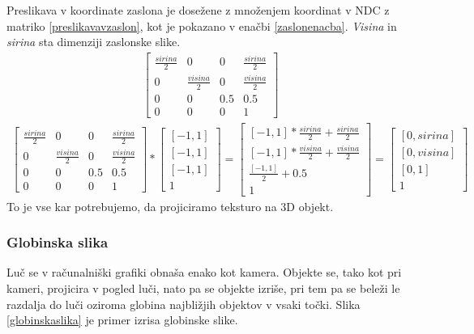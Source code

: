 \documentclass[a4paper, 12pt]{book}
\begin{document}
Preslikava v koordinate zaslona je dosežene z množenjem koordinat v NDC z matriko \ref{preslikavavzaslon}, kot je pokazano v enačbi \ref{zaslonenacba}. \emph{Visina} in \emph{sirina} sta dimenziji zaslonske slike.
\begin{align}
\begin{bmatrix}
\frac{sirina}{2} & 0 & 0 & \frac{sirina}{2}\\ 
0 & \frac{visina}{2} & 0 & \frac{visina}{2}\\ 
0 & 0 & 0.5 & 0.5 \\ 
0 & 0 & 0 & 1
\end{bmatrix}
\label{preslikavavzaslon}
\end{align}
\begin{align}
\begin{bmatrix}
\frac{sirina}{2} & 0 & 0 & \frac{sirina}{2}\\ 
0 & \frac{visina}{2} & 0 & \frac{visina}{2}\\ 
0 & 0 & 0.5 & 0.5 \\ 
0 & 0 & 0 & 1
\end{bmatrix}
*
\begin{bmatrix}
[-1, 1] \\ [-1, 1] \\ [-1, 1] \\ 1
\end{bmatrix}
=
\begin{bmatrix}
[-1, 1]*\frac{sirina}{2} + \frac{sirina}{2}\\
[-1, 1]*\frac{visina}{2} + \frac{visina}{2}\\
\frac{[-1, 1]}{2} + 0.5 \\
1
\end{bmatrix}
=
\begin{bmatrix}
[0, sirina] \\
[0, visina] \\
[0, 1] \\
1
\end{bmatrix}
\label{zaslonenacba}
\end{align}
To je vse kar potrebujemo, da projiciramo teksturo na 3D objekt.

\subsubsection*{Globinska slika}
Luč se v računalniški grafiki obnaša enako kot kamera. Objekte se, tako kot pri kameri, projicira v pogled luči, nato pa se objekte izriše, pri tem pa se beleži le razdalja do luči oziroma globina najbližjih objektov v vsaki točki. Slika \ref{globinskaslika} je primer izrisa globinske slike.
\end{document}
